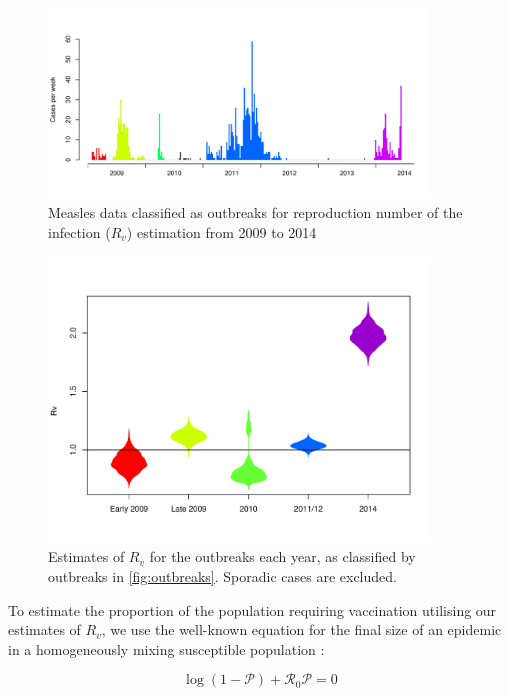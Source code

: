\documentclass{article}
\newcommand{\Pe}{\mathcal{P}}
\newcommand{\Ro}{\mathcal{R}_0}
\begin{document}
\begin{figure}[H]
     \centering
     \includegraphics[width=0.9\textwidth]{outbreaks_for_R0.pdf}
     \caption{Measles data classified as outbreaks for reproduction number of the infection ($R_v$) estimation from 2009 to 2014}
     \label{fig:outbreaks}
\end{figure}

\begin{figure}[H]
     \centering
     \includegraphics[width=0.9\textwidth]{averageR0.pdf}
     \caption{Estimates of $R_v$ for the outbreaks each year, as classified by outbreaks in \autoref{fig:outbreaks}. Sporadic cases are excluded.}
     \label{fig:r0}
\end{figure}

To estimate the proportion of the population requiring vaccination utilising our estimates of $R_v$, we use the well-known equation for the final size of an epidemic in a homogeneously mixing susceptible population \citep{diekmann13}:

\begin{equation} \label{eq:eqn1}
\log\left(1-\Pe\right)+\Ro\Pe=0
\end{equation}
\end{document}
